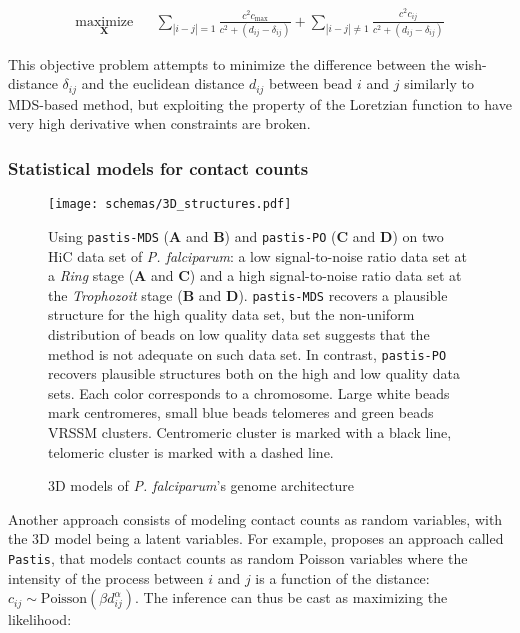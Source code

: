 \documentclass[2columns]{article}
\newcommand{\Xb}{\textbf{X}}
\begin{document}
\begin{equation*}
\renewcommand{\arraystretch}{2}
\begin{array}{ccl}
\underset{\Xb}{\text{maximize}} & & \underset{| i - j | = 1}{\sum} \frac{c^2
c_\text{max}}{c^2 + (d_{ij} - \delta_{ij})} + 
\underset{| i - j | \neq 1}{\sum} \frac{c^2 c_{ij}}{c^2 + (d_{ij} - \delta_{ij})}
\end{array}
\end{equation*}

This objective problem attempts to minimize the difference between the
wish-distance $\delta_{ij}$ and the euclidean distance $d_{ij}$ between bead
$i$ and $j$ similarly to MDS-based method, but exploiting the property of the
Loretzian function to have very high derivative when constraints are broken.


\subsubsection*{Statistical models for contact counts}

\begin{figure}
\texttt{[image: schemas/3D\_structures.pdf]}
\caption{3D models of {\em P. falciparum}'s genome architecture}{Using
\texttt{pastis-MDS} (\textbf{A} and \textbf{B}) and \texttt{pastis-PO}
(\textbf{C} and \textbf{D}) on two
HiC data set of {\em P. falciparum}: a low signal-to-noise ratio data set
at a {\em Ring} stage \citep{lemieux:genome-wide}
(\textbf{A} and \textbf{C}) and a high signal-to-noise ratio data set
at the {\em Trophozoit} stage \citep{ay:three-dimensional}
(\textbf{B} and \textbf{D}). \texttt{pastis-MDS} recovers a plausible
structure for the high quality data set, but the non-uniform distribution of
beads on low quality data set suggests that the method is not adequate on such
data set. In contrast, \texttt{pastis-PO} recovers plausible structures both
on the high and low quality data sets.
Each color corresponds to a chromosome.
Large white beads mark centromeres, small blue beads telomeres and green beads
VRSSM clusters. Centromeric cluster is marked with a black line, telomeric
cluster is marked with a dashed line.
}
\label{fig:3D_structures}
\end{figure}


Another approach consists of modeling contact counts as random variables, with
the 3D model being a latent variables. For example,
\citet{varoquaux:statistical} proposes an approach called
\texttt{Pastis}, that models contact counts as random Poisson variables where
the intensity of the process between $i$ and $j$ is a function of the
distance: $c_{ij} \sim \text{Poisson}(\beta d_{ij}^\alpha)$. The inference can
thus be cast as maximizing the likelihood:
\end{document}
